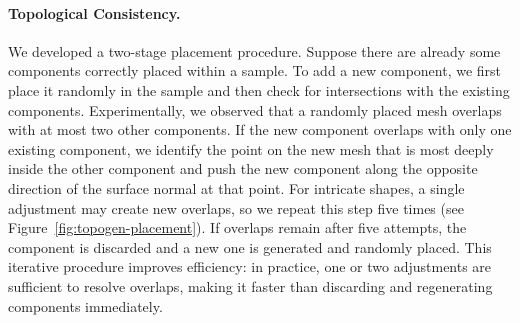 \paragraph{Topological Consistency.} 
We developed a two-stage placement procedure. Suppose there are already some components correctly placed within a sample. To add a new component, we first place it randomly in the sample and then check for intersections with the existing components. Experimentally, we observed that a randomly placed mesh overlaps with at most two other components. If the new component overlaps with only one existing component, we identify the point on the new mesh that is most deeply inside the other component and push the new component along the opposite direction of the surface normal at that point. For intricate shapes, a single adjustment may create new overlaps, so we repeat this step five times (see Figure~\ref{fig:topogen-placement}). If overlaps remain after five attempts, the component is discarded and a new one is generated and randomly placed. This iterative procedure improves efficiency: in practice, one or two adjustments are sufficient to resolve overlaps, making it faster than discarding and regenerating components immediately.

